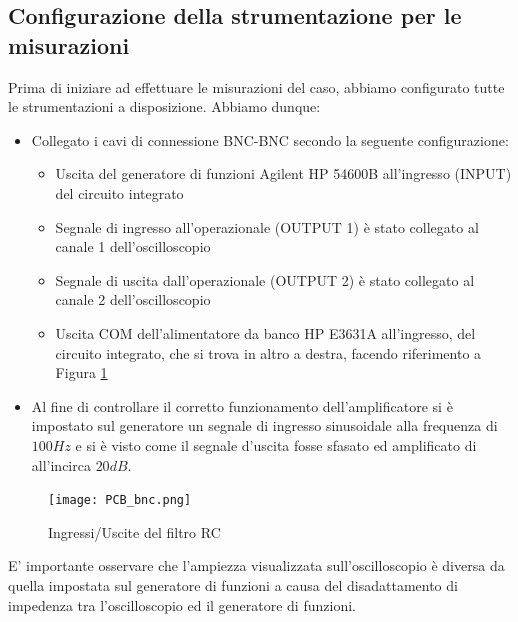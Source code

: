 \subsection{Configurazione della strumentazione per le misurazioni}
Prima di iniziare ad effettuare le misurazioni del caso, abbiamo configurato tutte le strumentazioni a disposizione. Abbiamo dunque:
\begin{itemize}
    \item Collegato i cavi di connessione BNC-BNC secondo la seguente configurazione:
    \begin{itemize}
        \item Uscita del generatore di funzioni Agilent HP 54600B all'ingresso (INPUT) del circuito integrato
        \item  Segnale di ingresso all'operazionale (OUTPUT 1) è stato collegato al canale 1 dell'oscilloscopio
        \item  Segnale di uscita dall'operazionale (OUTPUT 2) è stato collegato al canale 2 dell'oscilloscopio
        \item Uscita COM dell'alimentatore da banco HP E3631A all'ingresso, del circuito integrato, che si trova in altro a destra, facendo riferimento a Figura \ref{fig:pcb_bnc}
    \end{itemize}
    \item Al fine di controllare il corretto funzionamento dell'amplificatore si è impostato sul generatore un segnale di ingresso sinusoidale alla frequenza di $100Hz$ e si è visto come il segnale d'uscita fosse sfasato ed amplificato di all'incirca $20dB$.  
\end{itemize}
\begin{figure}[h]
        \centering
        \texttt{[image: PCB\_bnc.png]}
        \caption{Ingressi/Uscite del filtro RC}
        \label{fig:pcb_bnc}
    \end{figure}
\FloatBarrier
E' importante osservare che l'ampiezza visualizzata sull'oscilloscopio è diversa da quella impostata sul generatore di funzioni a causa del disadattamento di impedenza tra l'oscilloscopio ed il generatore di funzioni.
